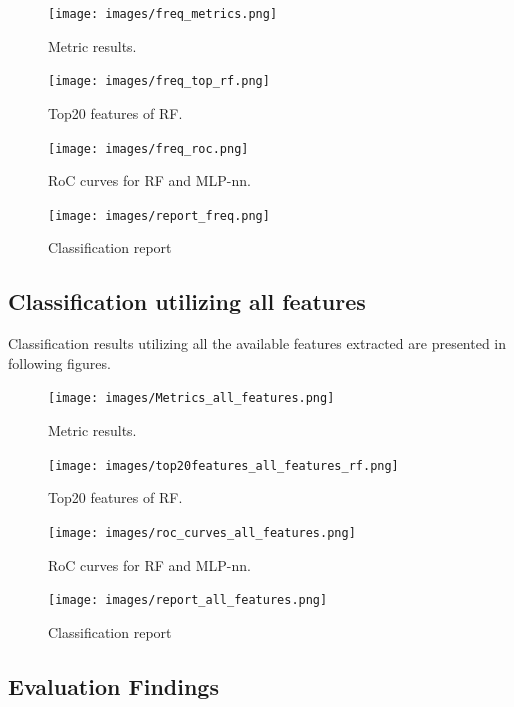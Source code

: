 \documentclass[11pt,a4paper]{report}
\begin{document}
		\begin{figure}[h]
			\centering
			\texttt{[image: images/freq\_metrics.png]}
			\caption{Metric results.}
			\label{fig1:}
		\end{figure}		

		\begin{figure}[h]
			\centering
			\texttt{[image: images/freq\_top\_rf.png]}
			\caption{Top20 features of RF.}
			\label{fig1:}
		\end{figure}		

		\begin{figure}[H]
			\centering
			\texttt{[image: images/freq\_roc.png]}
			\caption{RoC curves for RF and MLP-nn.}
			\label{fig1:}
		\end{figure}		

		\begin{figure}[H]
			\centering
			\texttt{[image: images/report\_freq.png]}
			\caption{Classification report}
			\label{fig1:}
		\end{figure}		


	\subsection{Classification utilizing all features}

		Classification results utilizing all the available features extracted are presented in following figures.
		\begin{figure}[H]
			\centering
			\texttt{[image: images/Metrics\_all\_features.png]}
			\caption{Metric results.}
			\label{fig1:}
		\end{figure}		

		\begin{figure}[H]
			\centering
			\texttt{[image: images/top20features\_all\_features\_rf.png]}
			\caption{Top20 features of RF.}
			\label{fig1:}
		\end{figure}		

		\begin{figure}[H]
			\centering
			\texttt{[image: images/roc\_curves\_all\_features.png]}
			\caption{RoC curves for RF and MLP-nn.}
			\label{fig1:}
		\end{figure}		

		\begin{figure}[H]
			\centering
			\texttt{[image: images/report\_all\_features.png]}
			\caption{Classification report}
			\label{fig1:}
		\end{figure}		


\subsection{Evaluation Findings}
\end{document}
